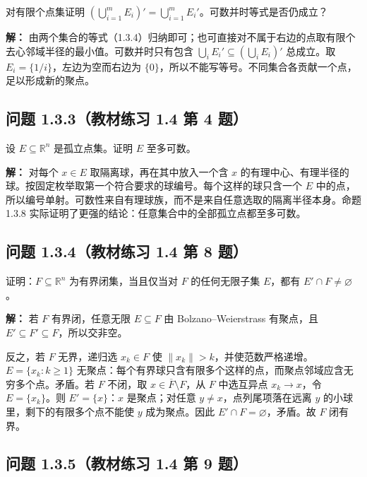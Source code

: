\documentclass[11pt,a4paper]{article}
\begin{document}
对有限个点集证明
\((\bigcup_{i=1}^mE_i)'=\bigcup_{i=1}^mE_i'\)。可数并时等式是否仍成立？

\textbf{解：}
由两个集合的等式（1.3.4）归纳即可；也可直接对不属于右边的点取有限个去心邻域半径的最小值。可数并时只有包含
\(\bigcup_iE_i'\subseteq(\bigcup_iE_i)'\) 总成立。取
\(E_i=\{1/i\}\)，左边为空而右边为
\(\{0\}\)，所以不能写等号。不同集合各贡献一个点，足以形成新的聚点。

\subsection{问题 1.3.3（教材练习 1.4 第 4
题）}\label{ux95eeux9898-1.3.3ux6559ux6750ux7ec3ux4e60-1.4-ux7b2c-4-ux9898}

设 \(E\subseteq\mathbb R^n\) 是孤立点集。证明 \(E\) 至多可数。

\textbf{解：} 对每个 \(x\in E\) 取隔离球，再在其中放入一个含 \(x\)
的有理中心、有理半径的球。按固定枚举取第一个符合要求的球编号。每个这样的球只含一个
\(E\)
中的点，所以编号单射。可数性来自有理球族，而不是来自任意选取的隔离半径本身。命题
1.3.8 实际证明了更强的结论：任意集合中的全部孤立点都至多可数。

\subsection{问题 1.3.4（教材练习 1.4 第 8
题）}\label{ux95eeux9898-1.3.4ux6559ux6750ux7ec3ux4e60-1.4-ux7b2c-8-ux9898}

证明：\(F\subseteq\mathbb R^n\) 为有界闭集，当且仅当对 \(F\)
的任何无限子集 \(E\)，都有 \(E'\cap F\ne\varnothing\)。

\textbf{解：} 若 \(F\) 有界闭，任意无限 \(E\subseteq F\) 由
Bolzano--Weierstrass 有聚点，且
\(E'\subseteq F'\subseteq F\)，所以交非空。

反之，若 \(F\) 无界，递归选 \(x_k\in F\) 使
\(\|x_k\|>k\)，并使范数严格递增。\(E=\{x_k:k\geq1\}\)
无聚点：每个有界球只含有限多个这样的点，而聚点邻域应含无穷多个点。矛盾。若
\(F\) 不闭，取 \(x\in\overline F\setminus F\)，从 \(F\) 中选互异点
\(x_k\to x\)，令 \(E=\{x_k\}\)。则 \(E'=\{x\}\)：\(x\) 是聚点；对任意
\(y\ne x\)，点列尾项落在远离 \(y\) 的小球里，剩下的有限多个点不能使
\(y\) 成为聚点。因此 \(E'\cap F=\varnothing\)，矛盾。故 \(F\) 闭有界。

\subsection{问题 1.3.5（教材练习 1.4 第 9
题）}\label{ux95eeux9898-1.3.5ux6559ux6750ux7ec3ux4e60-1.4-ux7b2c-9-ux9898}
\end{document}
